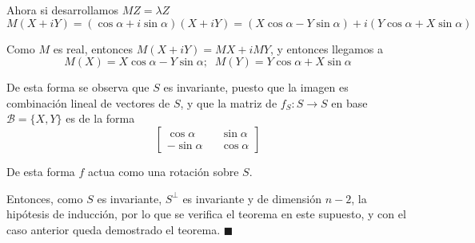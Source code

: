 \documentclass{preset}
\begin{document}
\noindent Ahora si desarrollamos $MZ=\lambda Z$
\vspace{-10pt}
\[M(X+iY)=(\cos \alpha + i \sin \alpha)(X+iY)=(X \cos \alpha - Y \sin \alpha) + i(Y \cos \alpha + X \sin \alpha)\]
\vspace{-30pt}

\noindent Como $M$ es real, entonces $M(X+iY)=MX +iMY$, y entonces llegamos a 
\vspace{-10pt}
\[M(X)=X \cos \alpha - Y \sin \alpha; \;\; M(Y)=Y \cos \alpha + X \sin \alpha\]
\vspace{-30pt}

De esta forma se observa que $S$ es invariante, puesto que la imagen es combinación lineal de vectores de $S$, y que la matriz de $f_S : S\rightarrow S$ en base $\mathcal{B}=\{X,Y\}$ es de la forma
\vspace{-7pt}
\[\left[\begin{matrix}
\cos{\alpha} && \sin{\alpha} \\
-\sin{\alpha} && \cos{\alpha}
\end{matrix}\right]\]
\vspace{-15pt}

\noindent De esta forma $f$ actua como una rotación sobre $S$.

\noindent Entonces, como $S$ es invariante, $S^\perp$ es invariante y de dimensión $n-2$, la hipótesis de inducción, por lo que se verifica el teorema en este supuesto, y con el caso anterior queda demostrado el teorema.  $\blacksquare$
\end{document}
